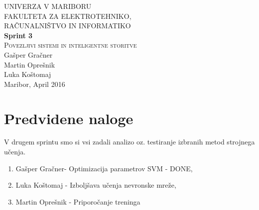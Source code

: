 \documentclass[a4paper,11pt]{article}
\begin{document}
\begin{titlepage}


\newcommand{\HRule}{\rule{\linewidth}{0.5mm}} %

\center %
 

\textsc{ UNIVERZA V MARIBORU\\ FAKULTETA ZA ELEKTROTEHNIKO,\\RAČUNALNIŠTVO IN INFORMATIKO}\\[5cm] %

{ \huge \bfseries \textbf{Sprint 3}}\\[0.4cm] %
\textsc{\large Povezljivi sistemi in inteligentne storitve}\\[5cm] %

{\large Gašper Gračner}\\[0.4cm]
{\large Martin Oprešnik}\\[0.4cm]
{\large Luka Koštomaj}\\[0.4cm] 

\vfill %
{\large Maribor, April 2016}\\[3cm] %
\end{titlepage}
\newpage


\section{Predvidene naloge}
V drugem sprintu smo si vsi zadali analizo oz. testiranje izbranih metod strojnega učenja.
	\begin{enumerate}
		\item{Gašper Gračner- Optimizacija parametrov SVM - \textcolor{OliveGreen}{DONE},}
		\item{Luka Koštomaj - Izboljšava učenja nevronske mreže,}
		\item{Martin Oprešnik - Priporočanje treninga}
	\end{enumerate}
	
\end{document}
